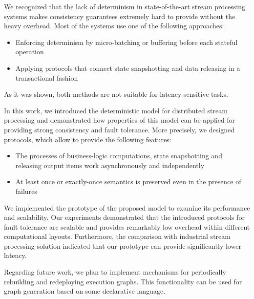
\label {fs-conclusion-seciton}

We recognized that the lack of determinism in state-of-the-art stream processing systems makes consistency guarantees extremely hard to provide without the heavy overhead. Most of the systems use one of the following approaches: 
\begin{itemize}
    \item Enforcing determinism by micro-batching or buffering before each stateful operation
    \item Applying protocols that connect state snapshotting and data releasing in a transactional fashion
\end{itemize}

As it was shown, both methods are not suitable for latency-sensitive tasks. 

In this work, we introduced the deterministic model for distributed stream processing and demonstrated how properties of this model can be applied for providing strong consistency and fault tolerance. More precisely, we designed protocols, which allow to provide the following features:

\begin{itemize}
    \item The processes of business-logic computations, state snapshotting and releasing output items work asynchronously and independently
    \item At least once or exactly-once semantics is preserved even in the presence of failures
\end{itemize}

We implemented the prototype of the proposed model to examine its performance and scalability. Our experiments demonstrated that the introduced protocols for fault tolerance are scalable and provides remarkably low overhead within different computational layouts. Furthermore, the comparison with industrial stream processing solution indicated that our prototype can provide significantly lower latency.

Regarding future work, we plan to implement mechanisms for periodically rebuilding and redeploying execution graphs. This functionality can be used for graph generation based on some declarative language.